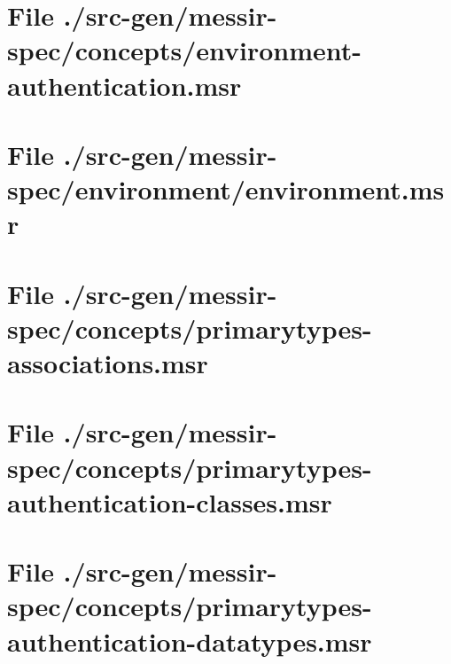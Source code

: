 \section[File /src-gen/messir-spec/concepts/environment-authentication.msr]{File ./src-gen/messir-spec/concepts/environment-authentication.msr}
\scriptsize

\normalsize
	
\section[File /src-gen/messir-spec/environment/environment.msr]{File ./src-gen/messir-spec/environment/environment.msr}
\scriptsize

\normalsize
	
\section[File /src-gen/messir-spec/concepts/primarytypes-associations.msr]{File ./src-gen/messir-spec/concepts/primarytypes-associations.msr}
\scriptsize

\normalsize
	
\section[File /src-gen/messir-spec/concepts/primarytypes-authentication-classes.msr]{File ./src-gen/messir-spec/concepts/primarytypes-authentication-classes.msr}
\scriptsize

\normalsize
	
\section[File /src-gen/messir-spec/concepts/primarytypes-authentication-datatypes.msr]{File ./src-gen/messir-spec/concepts/primarytypes-authentication-datatypes.msr}
\scriptsize

\normalsize
	
